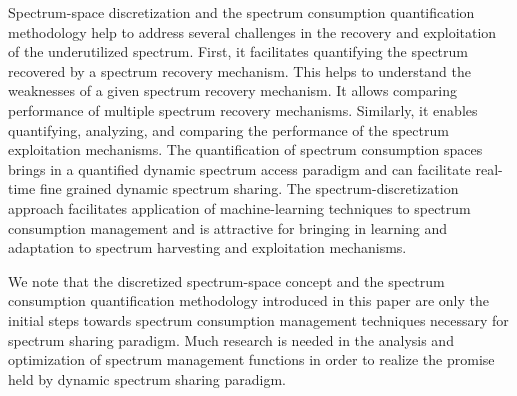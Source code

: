 \documentclass[journal,12pt,draftclsnofoot,onecolumn]{IEEEtran}
\begin{document}
Spectrum-space discretization and the spectrum consumption quantification methodology help to address several challenges in the recovery and exploitation of the underutilized spectrum. First, it facilitates quantifying the spectrum recovered by a spectrum recovery mechanism. This helps to understand the weaknesses of a given spectrum recovery mechanism. It allows comparing performance of multiple spectrum recovery mechanisms. Similarly, it enables quantifying, analyzing, and comparing the performance of the spectrum exploitation mechanisms. The quantification of spectrum consumption spaces brings in a quantified dynamic spectrum access paradigm and can facilitate real-time fine grained dynamic spectrum sharing. The spectrum-discretization approach facilitates application of machine-learning techniques to spectrum consumption management and is attractive for bringing in learning and adaptation to spectrum harvesting and exploitation mechanisms.

We note that the discretized spectrum-space concept and the spectrum consumption quantification methodology introduced in this paper are only the initial steps towards spectrum consumption management techniques necessary for spectrum sharing paradigm. Much research is needed in the analysis and optimization of spectrum management functions in order to realize the promise held by dynamic spectrum sharing paradigm.
\end{document}
